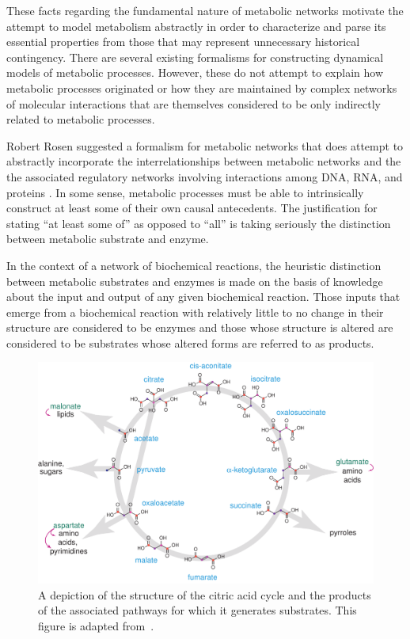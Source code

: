 \documentclass[10pt]{article}
\theoremstyle{plain}
\theoremstyle{definition}
\theoremstyle{remark}
\begin{document}
These facts regarding the fundamental nature of metabolic networks motivate the attempt to model metabolism abstractly in order to characterize and parse its essential properties from those that may represent unnecessary historical contingency. There are several existing formalisms for constructing dynamical models of metabolic processes. However, these do not attempt to explain how metabolic processes originated or how they are maintained by complex networks of molecular interactions that are themselves considered to be only indirectly related to metabolic processes.

Robert Rosen suggested a formalism for metabolic networks that does attempt to abstractly incorporate the interrelationships between metabolic networks and the the associated regulatory networks involving interactions among DNA, RNA, and proteins \cite{Rosen1972,Rosen1991}. In some sense, metabolic processes must be able to intrinsically construct at least some of their own causal antecedents. The justification for stating ``at least some of'' as opposed to ``all'' is taking seriously the distinction between metabolic substrate and enzyme.

In the context of a network of biochemical reactions, the heuristic distinction between metabolic substrates and enzymes is made on the basis of knowledge about the input and output of any given biochemical reaction. Those inputs that emerge from a biochemical reaction with relatively little to no change in their structure are considered to be enzymes and those whose structure is altered are considered to be substrates whose altered forms are referred to as products.

\begin{figure}
\begin{center}
\noindent\includegraphics[width=0.7\columnwidth]{fig/rTCA-skeleton.pdf}
\end{center}
\caption[TCA cycle]{A depiction of the structure of the citric acid cycle and the products of the associated pathways for which it generates substrates. This figure is adapted from~\cite{Braakman2012a}.}
\label{fig:ctacyc}
\end{figure}
\end{document}
